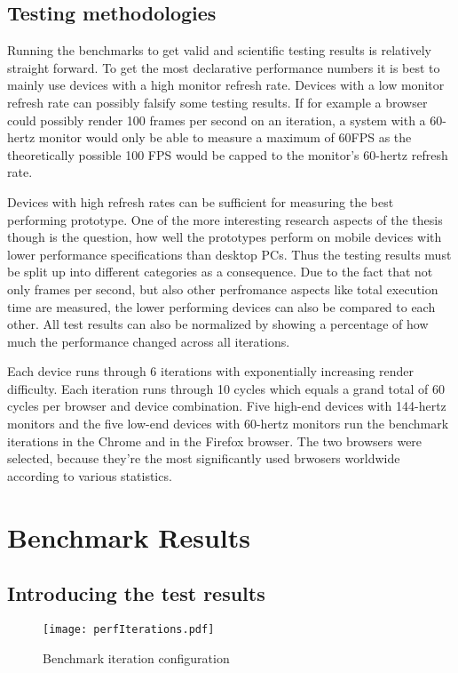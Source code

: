 \subsection{Testing methodologies}

Running the benchmarks to get valid and scientific testing results is relatively straight forward. To get the most declarative performance numbers it is best to mainly use devices with a high monitor refresh rate. Devices with a low monitor refresh rate can possibly falsify some testing results. If for example a browser could possibly render 100 frames per second on an iteration, a system with a 60-hertz monitor would only be able to measure a maximum of 60FPS as the theoretically possible 100 FPS would be capped to the monitor's 60-hertz refresh rate.

Devices with high refresh rates can be sufficient for measuring the best performing prototype. One of the more interesting research aspects of the thesis though is the question, how well the prototypes perform on mobile devices with lower performance specifications than desktop PCs. Thus the testing results must be split up into different categories as a consequence. Due to the fact that not only frames per second, but also other perfromance aspects like total execution time are measured, the lower performing devices can also be compared to each other. All test results can also be normalized by showing a percentage of how much the performance changed across all iterations.

Each device runs through 6 iterations with exponentially increasing render difficulty. Each iteration runs through 10 cycles which equals a grand total of 60 cycles per browser and device combination. Five high-end devices with 144-hertz monitors and the five low-end devices with 60-hertz monitors run the benchmark iterations in the Chrome and in the Firefox browser. The two browsers were selected, because they're the most significantly used brwosers worldwide according to various statistics. 

\section{Benchmark Results}

\subsection{Introducing the test results}

\begin{figure}
\centering
\texttt{[image: perfIterations.pdf]}
\caption{Benchmark iteration configuration}
\label{fig:perfIterations}
\end{figure}

